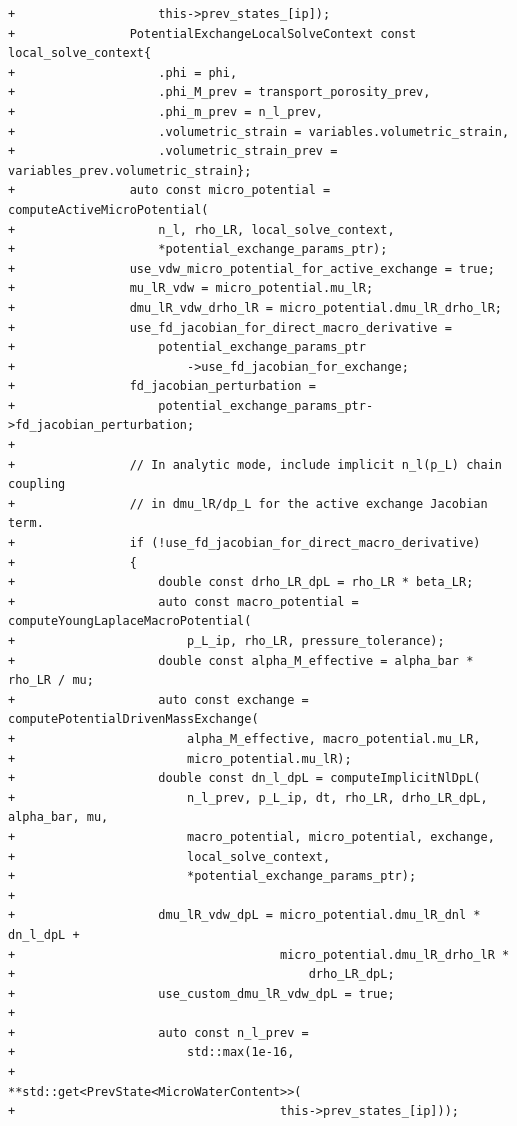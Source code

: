 \documentclass[10pt]{article}
\begin{document}
\begin{lstlisting}
+                    this->prev_states_[ip]);
+                PotentialExchangeLocalSolveContext const local_solve_context{
+                    .phi = phi,
+                    .phi_M_prev = transport_porosity_prev,
+                    .phi_m_prev = n_l_prev,
+                    .volumetric_strain = variables.volumetric_strain,
+                    .volumetric_strain_prev = variables_prev.volumetric_strain};
+                auto const micro_potential = computeActiveMicroPotential(
+                    n_l, rho_LR, local_solve_context,
+                    *potential_exchange_params_ptr);
+                use_vdw_micro_potential_for_active_exchange = true;
+                mu_lR_vdw = micro_potential.mu_lR;
+                dmu_lR_vdw_drho_lR = micro_potential.dmu_lR_drho_lR;
+                use_fd_jacobian_for_direct_macro_derivative =
+                    potential_exchange_params_ptr
+                        ->use_fd_jacobian_for_exchange;
+                fd_jacobian_perturbation =
+                    potential_exchange_params_ptr->fd_jacobian_perturbation;
+
+                // In analytic mode, include implicit n_l(p_L) chain coupling
+                // in dmu_lR/dp_L for the active exchange Jacobian term.
+                if (!use_fd_jacobian_for_direct_macro_derivative)
+                {
+                    double const drho_LR_dpL = rho_LR * beta_LR;
+                    auto const macro_potential = computeYoungLaplaceMacroPotential(
+                        p_L_ip, rho_LR, pressure_tolerance);
+                    double const alpha_M_effective = alpha_bar * rho_LR / mu;
+                    auto const exchange = computePotentialDrivenMassExchange(
+                        alpha_M_effective, macro_potential.mu_LR,
+                        micro_potential.mu_lR);
+                    double const dn_l_dpL = computeImplicitNlDpL(
+                        n_l_prev, p_L_ip, dt, rho_LR, drho_LR_dpL, alpha_bar, mu,
+                        macro_potential, micro_potential, exchange,
+                        local_solve_context,
+                        *potential_exchange_params_ptr);
+
+                    dmu_lR_vdw_dpL = micro_potential.dmu_lR_dnl * dn_l_dpL +
+                                     micro_potential.dmu_lR_drho_lR *
+                                         drho_LR_dpL;
+                    use_custom_dmu_lR_vdw_dpL = true;
+
+                    auto const n_l_prev =
+                        std::max(1e-16,
+                                 **std::get<PrevState<MicroWaterContent>>(
+                                     this->prev_states_[ip]));

\end{lstlisting}
\end{document}
